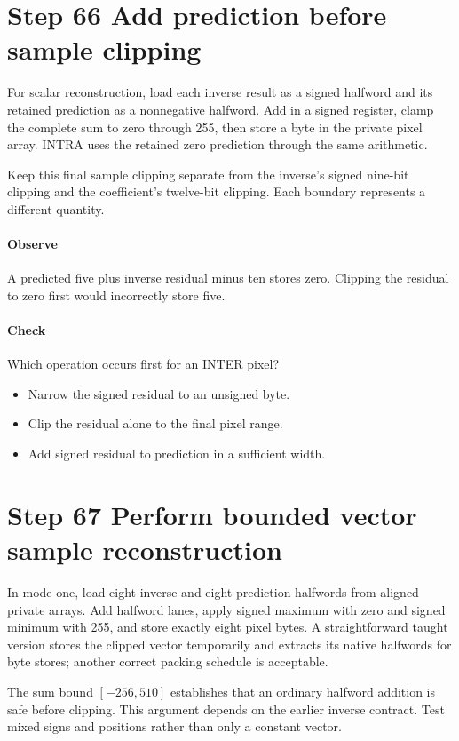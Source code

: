 \section{Step 66 Add prediction before sample clipping}\label{h263-block-s06}
For scalar reconstruction, load each inverse result as a signed halfword and its
retained prediction as a nonnegative halfword. Add in a signed register, clamp
the complete sum to zero through 255, then store a byte in the private pixel
array. INTRA uses the retained zero prediction through the same arithmetic.

Keep this final sample clipping separate from the inverse's signed nine-bit
clipping and the coefficient's twelve-bit clipping. Each boundary represents a
different quantity.

\paragraph{Observe} A predicted five plus inverse residual minus ten stores zero.
Clipping the residual to zero first would incorrectly store five.
\paragraph{Check} Which operation occurs first for an INTER pixel?
\begin{itemize}
  \item[A.] Narrow the signed residual to an unsigned byte.
  \item[B.] Clip the residual alone to the final pixel range.
  \item[C.] Add signed residual to prediction in a sufficient width.
\end{itemize}

\section{Step 67 Perform bounded vector sample reconstruction}\label{h263-block-s07}
In mode one, load eight inverse and eight prediction halfwords from aligned
private arrays. Add halfword lanes, apply signed maximum with zero and signed
minimum with 255, and store exactly eight pixel bytes. A straightforward taught
version stores the clipped vector temporarily and extracts its native halfwords
for byte stores; another correct packing schedule is acceptable.

The sum bound $[-256,510]$ establishes that an ordinary halfword addition is
safe before clipping. This argument depends on the earlier inverse contract.
Test mixed signs and positions rather than only a constant vector.

